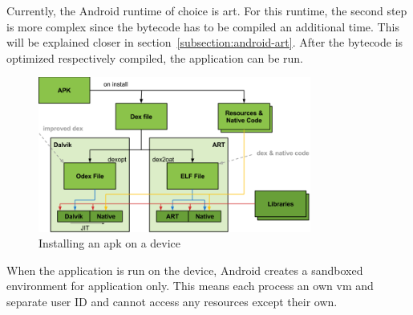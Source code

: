 \newline
Currently, the Android runtime of choice is \gls{art}.
For this runtime, the second step is more complex since the bytecode has to be compiled an additional time.
This will be explained closer in section~\ref{subsection:android-art}.
\newline
After the bytecode is optimized respectively compiled, the application can be run.
\newline
\begin{figure}[h]
    \centering
    \includegraphics[width=0.8\textwidth]{data/install.png}
    \caption{Installing an \gls{apk} on a device \cite{googleIOArt}}
    \label{fig:install}
\end{figure}
When the application is run on the device, Android creates a sandboxed environment for application only.
This means each process an own \gls{vm} and separate user ID and cannot access any resources except their own. \cite{developerFundamentals}
